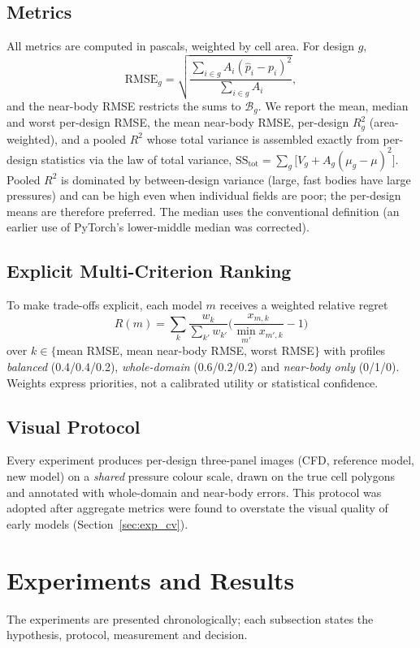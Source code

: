 \documentclass[journal]{IEEEtran}
\newcommand{\RMSE}{\mathrm{RMSE}}
\begin{document}
\subsection{Metrics}
All metrics are computed in pascals, weighted by cell area. For design $g$,
\begin{equation}
\RMSE_g=\sqrt{\frac{\sum_{i\in g}A_i(\hat p_i-p_i)^2}{\sum_{i\in g}A_i}},
\end{equation}
and the near-body RMSE restricts the sums to $\mathcal{B}_g$. We report the
mean, median and worst per-design RMSE, the mean near-body RMSE, per-design
$R^2_g$ (area-weighted), and a pooled $R^2$ whose total variance is assembled
exactly from per-design statistics via the law of total variance,
$\mathrm{SS}_\mathrm{tot}=\sum_g\big[V_g+A_g(\mu_g-\mu)^2\big]$.
Pooled $R^2$ is dominated by between-design variance (large, fast bodies have
large pressures) and can be high even when individual fields are poor; the
per-design means are therefore preferred. The median uses the conventional
definition (an earlier use of PyTorch's lower-middle median was corrected).

\subsection{Explicit Multi-Criterion Ranking}
To make trade-offs explicit, each model $m$ receives a weighted relative regret
\begin{equation}
R(m)=\sum_k \frac{w_k}{\sum_{k'}w_{k'}}\Big(\frac{x_{m,k}}{\min_{m'}x_{m',k}}-1\Big)
\end{equation}
over $k\in\{$mean RMSE, mean near-body RMSE, worst RMSE$\}$ with profiles
\emph{balanced} (0.4/0.4/0.2), \emph{whole-domain} (0.6/0.2/0.2) and
\emph{near-body only} (0/1/0). Weights express priorities, not a calibrated
utility or statistical confidence.

\subsection{Visual Protocol}
Every experiment produces per-design three-panel images (CFD, reference model,
new model) on a \emph{shared} pressure colour scale, drawn on the true cell
polygons and annotated with whole-domain and near-body errors. This protocol was
adopted after aggregate metrics were found to overstate the visual quality of
early models (Section~\ref{sec:exp_cv}).

\section{Experiments and Results}
\label{sec:results}
The experiments are presented chronologically; each subsection states the
hypothesis, protocol, measurement and decision.
\end{document}
